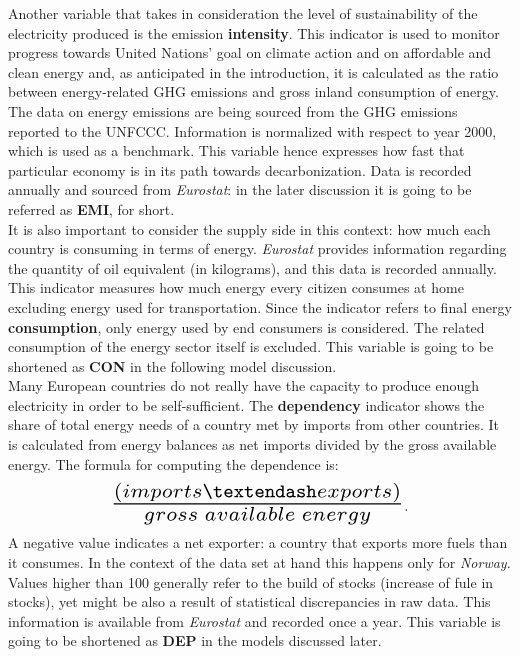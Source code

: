\documentclass{book}
\begin{document}
\noindent Another variable that takes in consideration the level of sustainability of the electricity produced is the emission \textbf{intensity}. This indicator is used to monitor progress towards United Nations' goal on climate action and on affordable and clean energy and, as anticipated in the introduction, it is calculated as the ratio between energy-related GHG emissions and gross inland consumption of energy. The data on energy emissions are being sourced from the GHG emissions reported to the UNFCCC. Information is normalized with respect to year 2000, which is used as a benchmark. This variable hence expresses how fast that particular economy is in its path towards decarbonization. Data is recorded annually and sourced from \textit{Eurostat}: in the later discussion it is going to be referred as \textbf{EMI}, for short.\\

\noindent It is also important to consider the supply side in this context: how much each country is consuming in terms of energy. \textit{Eurostat} provides information regarding the quantity of oil equivalent (in kilograms), and this data is recorded annually. This indicator measures how much energy every citizen consumes at home excluding energy used for transportation. Since the indicator refers to final energy \textbf{consumption}, only energy used by end consumers is considered. The related consumption of the energy sector itself is excluded. This variable is going to be shortened as \textbf{CON} in the following model discussion.\\

\noindent Many European countries do not really have the capacity to produce enough electricity in order to be self-sufficient. The \textbf{dependency} indicator shows the share of total energy needs of a country met by imports from other countries. It is calculated from energy balances as net imports divided by the gross available energy. The formula for computing the dependence is: $$ \scalebox{2} {$\frac{(imports – exports)}{gross\;available\;energy}$}.$$ A negative value indicates a net exporter: a country that exports more fuels than it consumes. In the context of the data set at hand this happens only for \textit{Norway}. Values higher than 100 generally refer to the build of stocks (increase of fule in stocks), yet might be also a result of statistical discrepancies in raw data. This information is available from \textit{Eurostat} and recorded once a year. This variable is going to be shortened as \textbf{DEP} in the models discussed later.\\
\end{document}
